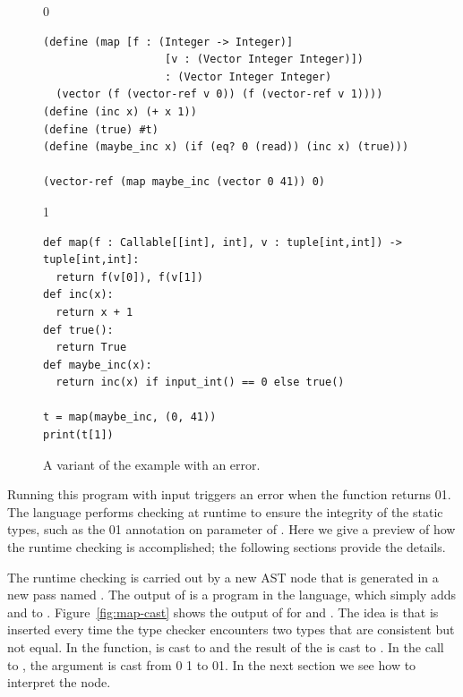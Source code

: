 \documentclass[7x10]{TimesAPriori_MIT}%
\def\racketEd{0}
\def\pythonEd{1}
\providecommand{\BookEdition}{1}
\let\edition\BookEdition
\newcommand{\racket}[1]{{\if\edition\racketEd{#1}\fi}}
\newcommand{\pythonColor}[0]{}
\newcommand{\python}[1]{{\if\edition\pythonEd\pythonColor #1\fi}}
\numberwithin{theorem}{chapter}
\numberwithin{definition}{chapter}
\numberwithin{equation}{chapter}
\begin{document}
\begin{figure}[tbp]
\begin{tcolorbox}[colback=white]  
{\if\edition\racketEd    
\begin{lstlisting}
(define (map [f : (Integer -> Integer)]
                   [v : (Vector Integer Integer)])
                   : (Vector Integer Integer)
  (vector (f (vector-ref v 0)) (f (vector-ref v 1))))
(define (inc x) (+ x 1))
(define (true) #t)
(define (maybe_inc x) (if (eq? 0 (read)) (inc x) (true)))

(vector-ref (map maybe_inc (vector 0 41)) 0)
\end{lstlisting}
\fi}
{\if\edition\pythonEd\pythonColor    
\begin{lstlisting}
def map(f : Callable[[int], int], v : tuple[int,int]) -> tuple[int,int]:
  return f(v[0]), f(v[1])
def inc(x):
  return x + 1
def true():
  return True
def maybe_inc(x):
  return inc(x) if input_int() == 0 else true()

t = map(maybe_inc, (0, 41))
print(t[1])
\end{lstlisting}
\fi}
\vspace{-5pt}
\end{tcolorbox}

\caption{A variant of the  example with an error.}
\label{fig:map-maybe_inc}
\end{figure}

Running this program with input  triggers an
error when the  function returns
\racket{}\python{}.  The \LangGrad{} language
performs checking at runtime to ensure the integrity of the static
types, such as the
\racket{}\python{}
annotation on
parameter  of .
Here we give a preview of how the runtime checking is accomplished;
the following sections provide the details.

The runtime checking is carried out by a new  AST node that
is generated in a new pass named .  The output of
 is a program in the \LangCast{} language, which
simply adds  and \CANYTY{} to \LangLam{}.
%
Figure~\ref{fig:map-cast} shows the output of  for
 and .  The idea is that  is
inserted every time the type checker encounters two types that are
consistent but not equal. In the  function,  is
cast to \INTTY{} and the result of the \code{+} is cast to
\CANYTY{}.  In the call to , the  argument
is cast from
\racket{}
\python{}
to 
\racket{}\python{}.
%
In the next section we see how to interpret the  node.
\end{document}
